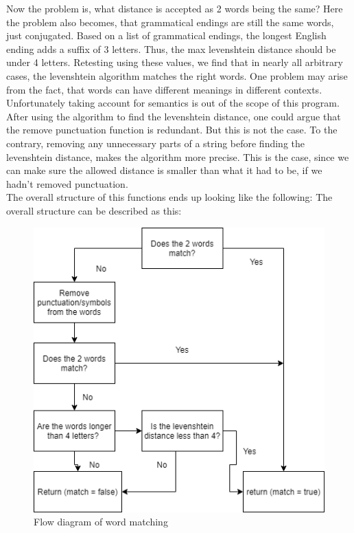 Now the problem is, what distance is accepted as 2 words being the same?
Here the problem also becomes, that grammatical endings are still the same words, just conjugated.
Based on a list of grammatical endings, the longest English ending adds a suffix of 3 letters\cite{grammar_endings}. Thus,
the max levenshtein distance should be under 4 letters.
Retesting using these values, we find that in nearly all arbitrary cases, the levenshtein algorithm matches the right words.
One problem may arise from the fact, that words can have different meanings in different contexts. Unfortunately taking account for semantics is out of the scope of this program. \\

After using the algorithm to find the levenshtein distance, one could argue that the remove punctuation function is redundant. But this is not the case. To the contrary, removing any
unnecessary parts of a string before finding the levenshtein distance, makes the algorithm more precise. This is the case, since we can make sure the allowed distance
is smaller than what it had to be, if we hadn't removed punctuation. \\

The overall structure of this functions ends up looking like the following: %
\newpage
The overall structure can be described as this:
\begin{figure}[H]
  \centering
  \includegraphics[scale = 0.55]{figures/is_match}
  \caption{Flow diagram of word matching}\label{fig:is_match}
\end{figure}

